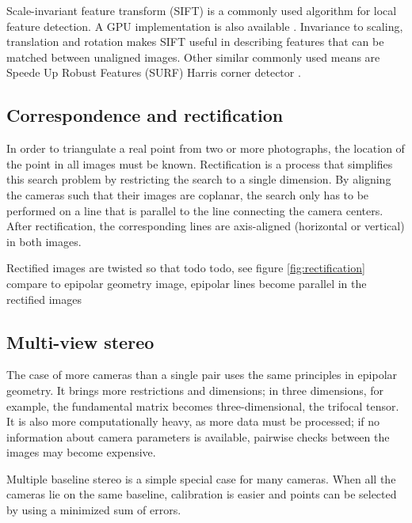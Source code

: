 Scale-invariant feature transform (SIFT) \cite{lowe1999object} is a commonly used algorithm for local feature detection. A GPU implementation is also available \cite{changchang2007siftgpu}.  Invariance to scaling, translation and rotation makes SIFT useful in describing features that can be matched between unaligned images. Other similar commonly used means are Speede Up Robust Features (SURF) \cite{bay2006surf} Harris corner detector \cite{harris1988combined}.



\subsection{Correspondence and rectification} %


In order to triangulate a real point from two or more photographs, the location of the point in all images must be known.
Rectification is a process that simplifies this search problem by restricting the search to a single dimension.
By aligning the cameras such that their images are coplanar, the search only has to be performed on a line that is parallel to the line connecting the camera centers.
After rectification, the corresponding lines are axis-aligned (horizontal or vertical) in both images. \cite{hartley03multiview}

Rectified images are twisted so that todo todo, see figure \ref{fig:rectification} compare to epipolar geometry image, epipolar lines become parallel in the rectified images


\subsection{Multi-view stereo} %

The case of more cameras than a single pair uses the same principles in epipolar geometry.
It brings more restrictions and dimensions; in three dimensions, for example, the fundamental matrix becomes three-dimensional, the trifocal tensor. \cite{hartley03multiview}
It is also more computationally heavy, as more data must be processed; if no information about camera parameters is available, pairwise checks between the images may become expensive. \cite{wu2013towards}

Multiple baseline stereo is a simple special case for many cameras. When all the cameras lie on the same baseline, calibration is easier and points can be selected by using a minimized sum of errors. \cite{okutomi1993multiple}

